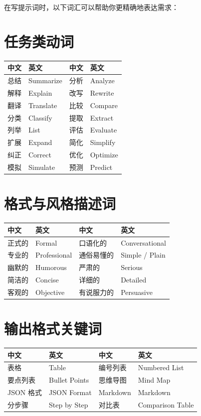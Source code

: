 在写提示词时，以下词汇可以帮助你更精确地表达需求：

\section{任务类动词}
\begin{center}
\begin{tabular}{llll}
  \toprule
  \textbf{中文} & \textbf{英文} & \textbf{中文} & \textbf{英文} \\
  \midrule
  总结 & Summarize & 分析 & Analyze \\
  解释 & Explain & 改写 & Rewrite \\
  翻译 & Translate & 比较 & Compare \\
  分类 & Classify & 提取 & Extract \\
  列举 & List & 评估 & Evaluate \\
  扩展 & Expand & 简化 & Simplify \\
  纠正 & Correct & 优化 & Optimize \\
  模拟 & Simulate & 预测 & Predict \\
  \bottomrule
\end{tabular}
\end{center}

\section{格式与风格描述词}
\begin{center}
\begin{tabular}{llll}
  \toprule
  \textbf{中文} & \textbf{英文} & \textbf{中文} & \textbf{英文} \\
  \midrule
  正式的 & Formal & 口语化的 & Conversational \\
  专业的 & Professional & 通俗易懂的 & Simple / Plain \\
  幽默的 & Humorous & 严肃的 & Serious \\
  简洁的 & Concise & 详细的 & Detailed \\
  客观的 & Objective & 有说服力的 & Persuasive \\
  \bottomrule
\end{tabular}
\end{center}

\section{输出格式关键词}
\begin{center}
\begin{tabular}{llll}
  \toprule
  \textbf{中文} & \textbf{英文} & \textbf{中文} & \textbf{英文} \\
  \midrule
  表格 & Table & 编号列表 & Numbered List \\
  要点列表 & Bullet Points & 思维导图 & Mind Map \\
  JSON 格式 & JSON Format & Markdown & Markdown \\
  分步骤 & Step by Step & 对比表 & Comparison Table \\
  \bottomrule
\end{tabular}
\end{center}

